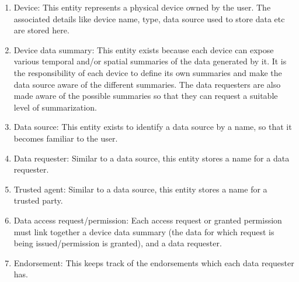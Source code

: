 \begin{enumerate}
	\item Device: This entity represents a physical device owned by the user. The associated details like device name, type, data source used to store data etc are stored here.

	\item Device data summary: This entity exists because each device can expose various temporal and/or spatial summaries of the data generated by it. It is the responsibility of each device to define its own summaries and make the data source aware of the different summaries. The data requesters are also made aware of the possible summaries so that they can request a suitable level of summarization.

	\item Data source: This entity exists to identify a data source by a name, so that it becomes familiar to the user.

	\item Data requester: Similar to a data source, this entity stores a name for a data requester.

	\item Trusted agent: Similar to a data source, this entity stores a name for a trusted party.

	\item Data access request/permission: Each access request or granted permission must link together a device data summary (the data for which request is being issued/permission is granted), and a data requester.

	\item Endorsement: This keeps track of the endorsements which each data requester has.
\end{enumerate}

